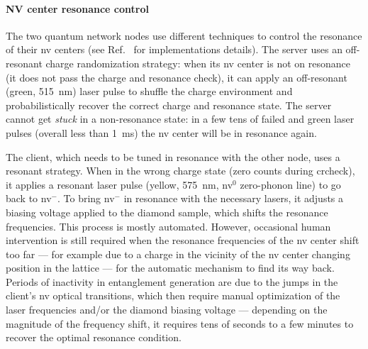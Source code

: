 \paragraph{NV center resonance control}

The two quantum network nodes use different techniques to control the resonance of their
\acrshort{nv} centers (see Ref.~\cite{pompili_2021_multinode} for implementations details). The
server uses an off-resonant charge randomization strategy: when its \acrshort{nv} center is not on
resonance (it does not pass the charge and resonance check), it can apply an off-resonant (green,
\qty{515}{\nm}) laser pulse to shuffle the charge environment and probabilistically recover the
correct charge and resonance state. The server cannot get \emph{stuck} in a non-resonance state: in
a few tens of failed  and green laser pulses (overall less than \qty{1}{\ms})
the \acrshort{nv} center will be in resonance again.

The client, which needs to be tuned in resonance with the other node, uses a resonant strategy. When
in the wrong charge state (zero counts during \acrshort{crcheck}), it applies a resonant laser pulse
(yellow, \qty{575}{\nm}, \acrshort{nv}${}^0$ zero-phonon line) to go back to \acrshort{nv}${}^-$. To
bring \acrshort{nv}${}^-$ in resonance with the necessary lasers, it adjusts a biasing voltage
applied to the diamond sample, which shifts the resonance frequencies. This process is mostly
automated. However, occasional human intervention is still required when the resonance frequencies
of the \acrshort{nv} center shift too far --- for example due to a charge in the vicinity of the
\acrshort{nv} center changing position in the lattice --- for the automatic mechanism to find its
way back. Periods of inactivity in entanglement generation are due to the jumps in the client's
\acrshort{nv} optical transitions, which then require manual optimization of the laser frequencies
and/or the diamond biasing voltage --- depending on the magnitude of the frequency shift, it
requires tens of seconds to a few minutes to recover the optimal resonance condition.

\begin{xstretch}
\printbibliography[heading=subbibintoc,title={References},notcategory=noprint]
\end{xstretch}
